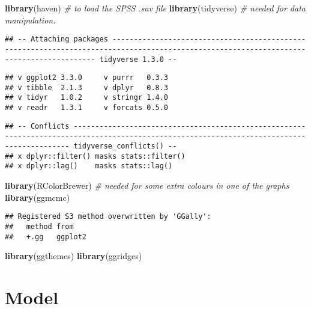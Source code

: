 \documentclass[
]{article}
\newenvironment{Shaded}{\begin{snugshade}}{\end{snugshade}}
\newcommand{\CommentTok}[1]{\textcolor[rgb]{0.56,0.35,0.01}{\textit{#1}}}
\newcommand{\KeywordTok}[1]{\textcolor[rgb]{0.13,0.29,0.53}{\textbf{#1}}}
\newcommand{\NormalTok}[1]{#1}
\begin{document}
\begin{Shaded}
\begin{Highlighting}[]
\KeywordTok{library}\NormalTok{(haven) }\CommentTok{# to load the SPSS .sav file}
\KeywordTok{library}\NormalTok{(tidyverse) }\CommentTok{# needed for data manipulation.}
\end{Highlighting}
\end{Shaded}

\begin{verbatim}
## -- Attaching packages ---------------------------------------------------------------------------------------------------------------------------------------- tidyverse 1.3.0 --
\end{verbatim}

\begin{verbatim}
## v ggplot2 3.3.0     v purrr   0.3.3
## v tibble  2.1.3     v dplyr   0.8.3
## v tidyr   1.0.2     v stringr 1.4.0
## v readr   1.3.1     v forcats 0.5.0
\end{verbatim}

\begin{verbatim}
## -- Conflicts ------------------------------------------------------------------------------------------------------------------------------------------- tidyverse_conflicts() --
## x dplyr::filter() masks stats::filter()
## x dplyr::lag()    masks stats::lag()
\end{verbatim}

\begin{Shaded}
\begin{Highlighting}[]
\KeywordTok{library}\NormalTok{(RColorBrewer) }\CommentTok{# needed for some extra colours in one of the graphs}
\KeywordTok{library}\NormalTok{(ggmcmc)}
\end{Highlighting}
\end{Shaded}

\begin{verbatim}
## Registered S3 method overwritten by 'GGally':
##   method from   
##   +.gg   ggplot2
\end{verbatim}

\begin{Shaded}
\begin{Highlighting}[]
\KeywordTok{library}\NormalTok{(ggthemes)}
\KeywordTok{library}\NormalTok{(ggridges)}
\end{Highlighting}
\end{Shaded}

\hypertarget{model}{%
\section{\texorpdfstring{\textbf{Model}}{Model}}\label{model}}
\end{document}
